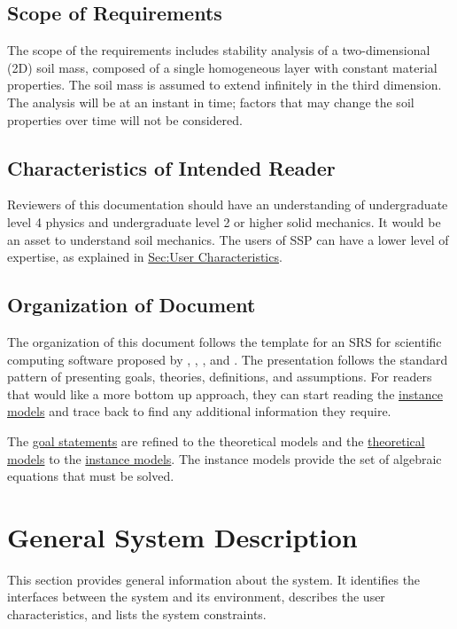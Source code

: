 \documentclass[12pt]{article}
\begin{document}
\subsection{Scope of Requirements}
\label{Sec:ReqsScope}
The scope of the requirements includes stability analysis of a two-dimensional (2D) soil mass, composed of a single homogeneous layer with constant material properties. The soil mass is assumed to extend infinitely in the third dimension. The analysis will be at an instant in time; factors that may change the soil properties over time will not be considered.

\subsection{Characteristics of Intended Reader}
\label{Sec:ReaderChars}
Reviewers of this documentation should have an understanding of undergraduate level 4 physics and undergraduate level 2 or higher solid mechanics. It would be an asset to understand soil mechanics. The users of SSP can have a lower level of expertise, as explained in \hyperref[Sec:UserChars]{Sec:User Characteristics}.

\subsection{Organization of Document}
\label{Sec:DocOrg}
The organization of this document follows the template for an SRS for scientific computing software proposed by \cite{koothoor2013}, \cite{smithLai2005}, \cite{smithEtAl2007}, and \cite{smithKoothoor2016}. The presentation follows the standard pattern of presenting goals, theories, definitions, and assumptions. For readers that would like a more bottom up approach, they can start reading the \hyperref[Sec:IMs]{instance models} and trace back to find any additional information they require.

The \hyperref[Sec:GoalStmt]{goal statements} are refined to the theoretical models and the \hyperref[Sec:TMs]{theoretical models} to the \hyperref[Sec:IMs]{instance models}. The instance models provide the set of algebraic equations that must be solved.

\section{General System Description}
\label{Sec:GenSysDesc}
This section provides general information about the system. It identifies the interfaces between the system and its environment, describes the user characteristics, and lists the system constraints.
\end{document}
